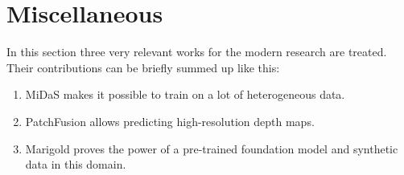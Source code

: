 \section{Miscellaneous}
\label{sec:miscellaneous}
In this section three very relevant works for the modern research are treated.
Their contributions can be briefly summed up like this:
\begin{enumerate}
	\item{MiDaS makes it possible to train on a lot of heterogeneous data.}
	\item{PatchFusion allows predicting high-resolution depth maps.}
	\item{Marigold proves the power of a pre-trained foundation model and synthetic data in this domain.}
\end{enumerate}

